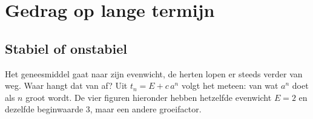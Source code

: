 \begin{oefeningen}
\end{oefeningen}

\section{Gedrag op lange termijn}

\subsection{Stabiel of onstabiel}

Het geneesmiddel gaat naar zijn evenwicht, de herten lopen er steeds verder van weg. Waar hangt dat van af? Uit $t_n = E + c\,a^n$ volgt het meteen: van wat $a^n$ doet als $n$ groot wordt. De vier figuren hieronder hebben hetzelfde evenwicht $E = 2$ en dezelfde beginwaarde 3, maar een andere groeifactor.

